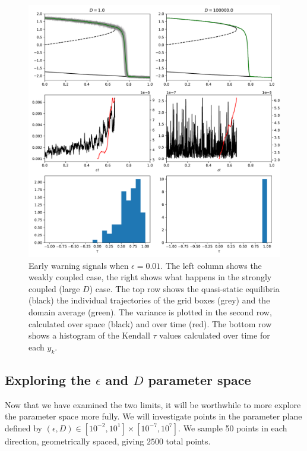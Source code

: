     \begin{figure}
      \centering
      \includegraphics[width=\textwidth,keepaspectratio]{coupled_variance}
      \caption[Early Warning Signals in the slowly forced limit]{Early warning signals when $\epsilon = 0.01$. The left column shows 
                the weakly coupled case, the right shows what happens in the strongly coupled (large $D$) case. 
                The top row shows the quasi-static equilibria (black) the individual
                trajectories of the grid boxes (grey) and the domain average (green).
			      The variance is plotted in the second row, calculated over space 
                (black) and over time (red). The bottom row shows a histogram of the Kendall $\tau$ values calculated over time for each $y_k$.}
              \label{fig:coupled_timeseries}
    \end{figure}
    \subsection{Exploring the $\epsilon$ and $D$ parameter space}
    Now that we have examined the two limits, it will be worthwhile to more explore the parameter space more fully.
    We will investigate points in the parameter plane defined by $(\epsilon,D) \in [10^{-2},10^1] \times [10^{-7},10^{7}]$.
    We sample 50 points in each direction, geometrically spaced, giving $2500$ total points.


